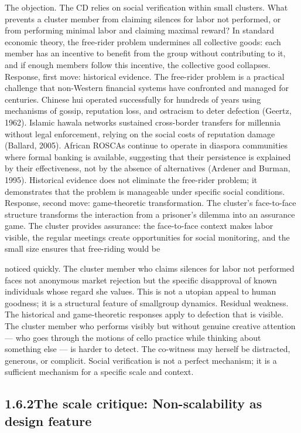 The objection. The CD relies on social verification within small clusters. What prevents a cluster member from claiming silences for labor not performed, or from performing minimal labor and claiming maximal reward? In standard economic theory, the free-rider problem undermines all collective goods: each member has an incentive to benefit from the group without contributing to it, and if enough members follow this incentive, the collective good collapses. Response, first move: historical evidence. The free-rider problem is a practical challenge that non-Western financial systems have confronted and managed for centuries. Chinese hui operated successfully for hundreds of years using mechanisms of gossip, reputation loss, and ostracism to deter defection (Geertz, 1962). Islamic hawala networks sustained cross-border transfers for millennia without legal enforcement, relying on the social costs of reputation damage (Ballard, 2005). African ROSCAs continue to operate in diaspora communities where formal banking is available, suggesting that their persistence is explained by their effectiveness, not by the absence of alternatives (Ardener and Burman, 1995). Historical evidence does not eliminate the free-rider problem; it demonstrates that the problem is manageable under specific social conditions. Response, second move: game-theoretic transformation. The cluster’s face-to-face structure transforms the interaction from a prisoner’s dilemma into an assurance game. The cluster provides assurance: the face-to-face context makes labor visible, the regular meetings create opportunities for social monitoring, and the small size ensures that free-riding would be

noticed quickly. The cluster member who claims silences for labor not performed faces not anonymous market rejection but the specific disapproval of known individuals whose regard she values. This is not a utopian appeal to human goodness; it is a structural feature of smallgroup dynamics. Residual weakness. The historical and game-theoretic responses apply to defection that is visible. The cluster member who performs visibly but without genuine creative attention — who goes through the motions of cello practice while thinking about something else — is harder to detect. The co-witness may herself be distracted, generous, or complicit. Social verification is not a perfect mechanism; it is a sufficient mechanism for a specific scale and context.

\subsection{1.6.2\quad The scale critique: Non-scalability as design feature}

